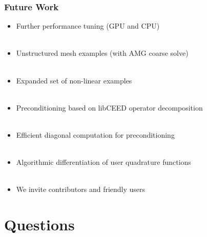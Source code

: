 \documentclass{beamer}
\begin{document}
\begin{frame}
\begin{center}
\frametitle{Future Work}

\begin{itemize}

\item Further performance tuning (GPU and CPU)\\

~\\

\item Unstructured mesh examples (with AMG coarse solve)\\

~\\

\item Expanded set of non-linear examples\\

~\\

\item Preconditioning based on libCEED operator decomposition\\

~\\

\item Efficient diagonal computation for preconditioning\\

~\\

\item Algorithmic differentiation of user quadrature functions\\

~\\

\item We invite contributors and friendly users

\end{itemize}

\end{center}
\end{frame}

\section{Questions}
\end{document}
